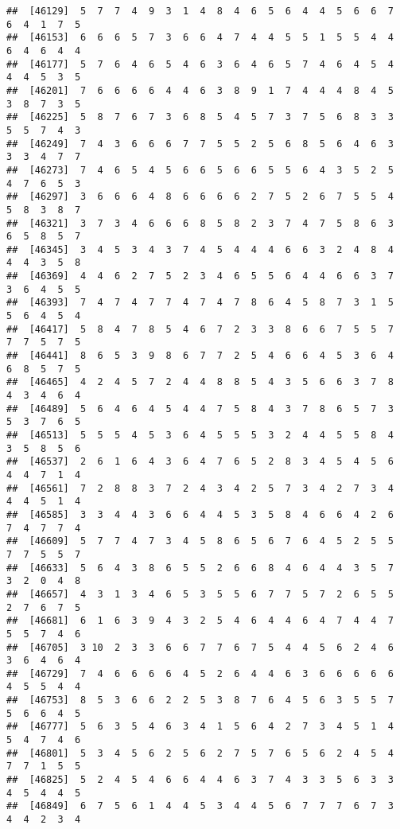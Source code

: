 \documentclass[
]{book}
\begin{document}
\begin{verbatim}
##  [46129]  5  7  7  4  9  3  1  4  8  4  6  5  6  4  4  5  6  6  7  6  4  1  7  5
##  [46153]  6  6  6  5  7  3  6  6  4  7  4  4  5  5  1  5  5  4  4  6  4  6  4  4
##  [46177]  5  7  6  4  6  5  4  6  3  6  4  6  5  7  4  6  4  5  4  4  4  5  3  5
##  [46201]  7  6  6  6  6  4  4  6  3  8  9  1  7  4  4  4  8  4  5  3  8  7  3  5
##  [46225]  5  8  7  6  7  3  6  8  5  4  5  7  3  7  5  6  8  3  3  5  5  7  4  3
##  [46249]  7  4  3  6  6  6  7  7  5  5  2  5  6  8  5  6  4  6  3  3  3  4  7  7
##  [46273]  7  4  6  5  4  5  6  6  5  6  6  5  5  6  4  3  5  2  5  4  7  6  5  3
##  [46297]  3  6  6  6  4  8  6  6  6  6  2  7  5  2  6  7  5  5  4  5  8  3  8  7
##  [46321]  3  7  3  4  6  6  6  8  5  8  2  3  7  4  7  5  8  6  3  6  5  8  5  7
##  [46345]  3  4  5  3  4  3  7  4  5  4  4  4  6  6  3  2  4  8  4  4  4  3  5  8
##  [46369]  4  4  6  2  7  5  2  3  4  6  5  5  6  4  4  6  6  3  7  3  6  4  5  5
##  [46393]  7  4  7  4  7  7  4  7  4  7  8  6  4  5  8  7  3  1  5  5  6  4  5  4
##  [46417]  5  8  4  7  8  5  4  6  7  2  3  3  8  6  6  7  5  5  7  7  7  5  7  5
##  [46441]  8  6  5  3  9  8  6  7  7  2  5  4  6  6  4  5  3  6  4  6  8  5  7  5
##  [46465]  4  2  4  5  7  2  4  4  8  8  5  4  3  5  6  6  3  7  8  4  3  4  6  4
##  [46489]  5  6  4  6  4  5  4  4  7  5  8  4  3  7  8  6  5  7  3  5  3  7  6  5
##  [46513]  5  5  5  4  5  3  6  4  5  5  5  3  2  4  4  5  5  8  4  3  5  8  5  6
##  [46537]  2  6  1  6  4  3  6  4  7  6  5  2  8  3  4  5  4  5  6  4  4  7  1  4
##  [46561]  7  2  8  8  3  7  2  4  3  4  2  5  7  3  4  2  7  3  4  4  4  5  1  4
##  [46585]  3  3  4  4  3  6  6  4  4  5  3  5  8  4  6  6  4  2  6  7  4  7  7  4
##  [46609]  5  7  7  4  7  3  4  5  8  6  5  6  7  6  4  5  2  5  5  7  7  5  5  7
##  [46633]  5  6  4  3  8  6  5  5  2  6  6  8  4  6  4  4  3  5  7  3  2  0  4  8
##  [46657]  4  3  1  3  4  6  5  3  5  5  6  7  7  5  7  2  6  5  5  2  7  6  7  5
##  [46681]  6  1  6  3  9  4  3  2  5  4  6  4  4  6  4  7  4  4  7  5  5  7  4  6
##  [46705]  3 10  2  3  3  6  6  7  7  6  7  5  4  4  5  6  2  4  6  3  6  4  6  4
##  [46729]  7  4  6  6  6  6  4  5  2  6  4  4  6  3  6  6  6  6  6  4  5  5  4  4
##  [46753]  8  5  3  6  6  2  2  5  3  8  7  6  4  5  6  3  5  5  7  5  6  6  4  5
##  [46777]  5  6  3  5  4  6  3  4  1  5  6  4  2  7  3  4  5  1  4  5  4  7  4  6
##  [46801]  5  3  4  5  6  2  5  6  2  7  5  7  6  5  6  2  4  5  4  7  7  1  5  5
##  [46825]  5  2  4  5  4  6  6  4  4  6  3  7  4  3  3  5  6  3  3  4  5  4  4  5
##  [46849]  6  7  5  6  1  4  4  5  3  4  4  5  6  7  7  7  6  7  3  4  4  2  3  4

\end{verbatim}
\end{document}
